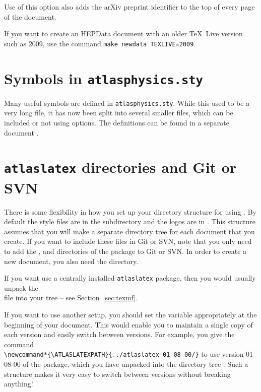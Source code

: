 Use of this option also adds the arXiv preprint identifier to the top
of every page of the document.

If you want to create an HEPData document with an older \TeX\ Live version such as 2009, 
use the command \texttt{make newdata TEXLIVE=2009}.


\section{Symbols in \texttt{atlasphysics.sty}}
\label{sec:atlasphysics}

Many useful symbols are defined in \texttt{atlasphysics.sty}.
While this used to be a very long file, it has now been split into several smaller files,
which can be included or not using options.
The definitions can be found in a separate document .


\section{\texttt{atlaslatex} directories and Git or SVN}
\label{sec:gitsvn}

There is some flexibility in how you set up your directory structure for using .
By default the  style files are in the  subdirectory and the
logos are in . This structure assumes that you will make a separate directory tree
for each document that you create. If you want to include these files in Git or SVN, note that you only need to add the
,  and  directories of the  package to Git or SVN.
In order to create a new document, you also need the  directory.

If you want use a centrally installed \texttt{atlaslatex} package, then you would usually unpack the\\
 file into your  tree -- see Section~\ref{sec:texmf}.

If you want to use another setup, you should set the variable  appropriately
at the beginning of your document. This would enable you to maintain a single copy of each 
 version and easily switch between versions.
For example, you give the command\\
\verb|\newcommand*{\ATLASLATEXPATH}{../atlaslatex-01-08-00/}|
to use version 01-08-00 of the  package, which you have unpacked into the directory tree
.
Such a structure makes it very easy to switch between  versions without breaking anything!


